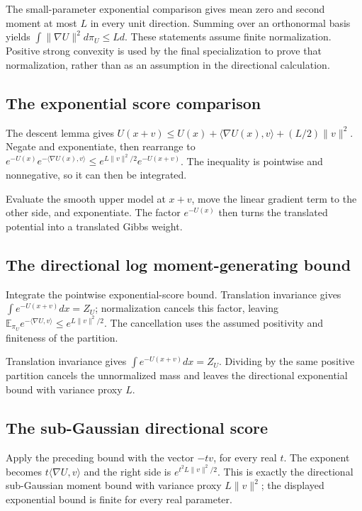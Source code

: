 \documentclass[11pt,a4paper]{article}
\begin{document}
The small-parameter exponential comparison gives mean zero and second moment at most \(L\) in every unit direction. Summing over an orthonormal basis yields \(\int\|\nabla U\|^2d\pi_U\le Ld\). These statements assume finite normalization. Positive strong convexity is used by the final specialization to prove that normalization, rather than as an assumption in the directional calculation.


\subsection{\texorpdfstring{The exponential score comparison}{The exponential score comparison}}


The descent lemma gives \(U(x+v)\le U(x)+\langle\nabla U(x),v\rangle+(L/2)\|v\|^2\). Negate and exponentiate, then rearrange to \(e^{-U(x)}e^{-\langle\nabla U(x),v\rangle}\le e^{L\|v\|^2/2}e^{-U(x+v)}\). The inequality is pointwise and nonnegative, so it can then be integrated.



Evaluate the smooth upper model at \(x+v\), move the linear gradient term to the other side, and exponentiate. The factor \(e^{-U(x)}\) then turns the translated potential into a translated Gibbs weight.


\subsection{\texorpdfstring{The directional log moment-generating bound}{The directional log moment-generating bound}}


Integrate the pointwise exponential-score bound. Translation invariance gives \(\int e^{-U(x+v)}dx=Z_U\); normalization cancels this factor, leaving \(\mathbb E_{\pi_U}e^{-\langle\nabla U,v\rangle}\le e^{L\|v\|^2/2}\). The cancellation uses the assumed positivity and finiteness of the partition.



Translation invariance gives \(\int e^{-U(x+v)}dx=Z_U\). Dividing by the same positive partition cancels the unnormalized mass and leaves the directional exponential bound with variance proxy \(L\).


\subsection{\texorpdfstring{The sub-Gaussian directional score}{The sub-Gaussian directional score}}


Apply the preceding bound with the vector \(-tv\), for every real \(t\). The exponent becomes \(t\langle\nabla U,v\rangle\) and the right side is \(e^{t^2L\|v\|^2/2}\). This is exactly the directional sub-Gaussian moment bound with variance proxy \(L\|v\|^2\); the displayed exponential bound is finite for every real parameter.
\end{document}
